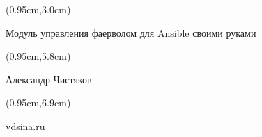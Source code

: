 \documentclass[xetex,18pt,aspectratio=43]{beamer}
\title[Модуль управления фаерволом для Ansible своими руками]{}
\author[Александр Чистяков, vdsina.ru]{}
\date{}
\newcommand\Bigfont{\fontsize{20}{20}\selectfont}
\newcommand\Authorfont{\fontsize{17}{17}\selectfont}
\newcommand\Orgfont{\fontsize{13}{13}\selectfont}
\begin{document}
{ %
    \begin{frame}[plain]
      \begin{textblock*}{\framewidth}(0.95cm,3.0cm) %
        \Bigfont
          \begin{center}
          Модуль управления фаерволом для Ansible своими руками
          \end{center}
      \end{textblock*}
      \begin{textblock*}{\framewidth}(0.95cm,5.8cm) %
        \Authorfont
          \begin{center}
          Александр Чистяков
          \end{center}
      \end{textblock*}
      \begin{textblock*}{\framewidth}(0.95cm,6.9cm) %
        \Orgfont
          \begin{center}
          \href{https://vdsina.ru}{\color{blue}vdsina.ru}
          \end{center}
      \end{textblock*}
     \end{frame}
}
\end{document}
